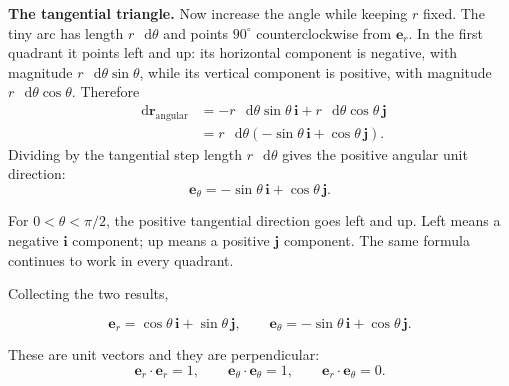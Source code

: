 \documentclass[11pt,a4paper]{article}
\newcommand{\er}{\bm e_r}
\newcommand{\etheta}{\bm e_\theta}
\newcommand{\ii}{\bm i}
\newcommand{\jj}{\bm j}
\newcommand{\rr}{\bm r}
\newcommand{\dd}{\mathop{}\!\mathrm d}
\begin{document}
{\color{gold!80!black}\bfseries The tangential triangle.}
Now increase the angle while keeping $r$ fixed. The tiny arc has length $r\,\dd\theta$ and points $90^\circ$ counterclockwise from $\er$. In the first quadrant it points left and up: its horizontal component is negative, with magnitude $r\,\dd\theta\sin\theta$, while its vertical component is positive, with magnitude $r\,\dd\theta\cos\theta$. Therefore
\begin{align*}
  \dd\rr_{\text{angular}}
  &=-r\,\dd\theta\sin\theta\,\ii
    +r\,\dd\theta\cos\theta\,\jj\\
  &=r\,\dd\theta
    \left(-\sin\theta\,\ii+\cos\theta\,\jj\right).
\end{align*}
Dividing by the tangential step length $r\,\dd\theta$ gives the positive angular unit direction:
\[
  \etheta=-\sin\theta\,\ii+\cos\theta\,\jj.
\]

\begin{idea}
For $0<\theta<\pi/2$, the positive tangential direction goes left and up. Left means a negative $\ii$ component; up means a positive $\jj$ component. The same formula continues to work in every quadrant.
\end{idea}

Collecting the two results,
\begin{result}
\[
  \boxed{\er=\cos\theta\,\ii+\sin\theta\,\jj},
  \qquad
  \boxed{\etheta=-\sin\theta\,\ii+\cos\theta\,\jj}.
\]
\end{result}

These are unit vectors and they are perpendicular:
\[
  \er\cdot\er=1,
  \qquad
  \etheta\cdot\etheta=1,
  \qquad
  \er\cdot\etheta=0.
\]

\begin{center}
\end{center}
\end{document}
